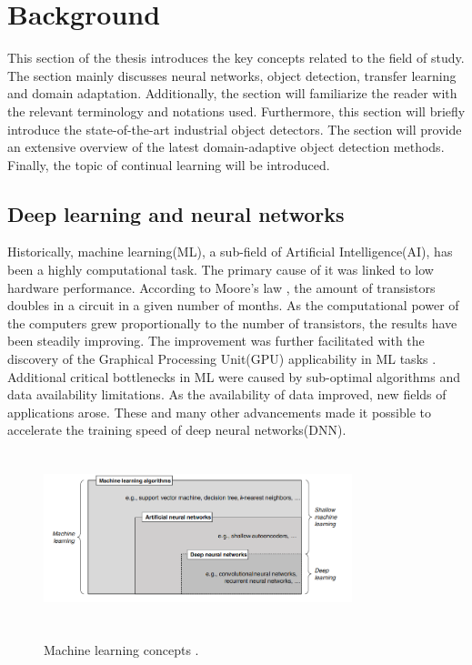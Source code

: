 \section{Background}
This section of the thesis introduces the key concepts related to the field of study. The section mainly discusses neural networks, object detection, transfer learning and domain adaptation. Additionally, the section will familiarize the reader with the relevant terminology and notations used. Furthermore, this section will briefly introduce the state-of-the-art industrial object detectors. The section will provide an extensive overview of the latest domain-adaptive object detection methods. Finally, the topic of  continual learning will be introduced. 
\subsection{Deep learning and neural networks}
Historically, machine learning(ML), a sub-field of Artificial Intelligence(AI), has been a highly computational task. The primary cause of it was linked to low hardware performance. According to Moore's law \cite{Etiemble2022}, the amount of transistors doubles in a circuit in a given number of months.  As the computational power of the computers grew proportionally to the number of transistors, the results have been steadily improving. The improvement was further facilitated with the discovery of the Graphical Processing Unit(GPU) applicability in ML tasks \cite{Hwang2018}. Additional critical bottlenecks in ML were caused by sub-optimal algorithms and data availability limitations. As the availability of data improved, new fields of applications arose. These and many other advancements made it possible to accelerate the training speed of deep neural networks(DNN).  

\begin{figure}[htb]
	\begin{center}
		\includegraphics[width=0.8\textwidth,height=50mm]{./ml1.png}
	\end{center}
	\caption{Machine learning concepts \cite{Janiesch2021}.}
	\begin{center}
		\label{MLConcepts}
	\end{center}
\end{figure}
\FloatBarrier

